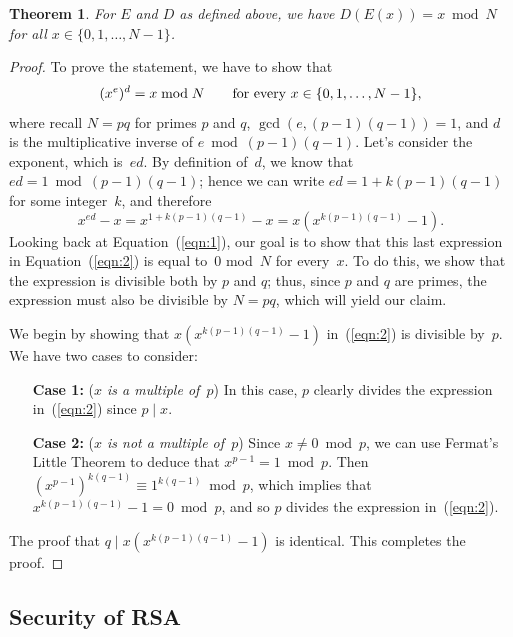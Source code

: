 \documentclass[11pt]{article}
\newcounter{thm}
\newtheorem{theorem}{Theorem}[thm]
\begin{document}
\begin{theorem}\label{thm:1}
For $E$ and $D$ as defined above, we have $D(E(x)) = x\bmod N$ for all $x\in\{0,1,\ldots,N-1\}$.
\end{theorem}
\begin{proof} To prove the statement, we have to show
that
\begin{equation}\label{eqn:1}
(x^e)^d = x\bmod N\qquad\hbox{\rm for every $x\in\{0,1,\ldots,N-1\}$},
\end{equation}
where recall $N= pq$ for primes $p$ and $q$, $\gcd(e,(p-1)(q-1))=1$, and $d$ is the multiplicative inverse of $e\bmod (p-1)(q-1)$. Let's consider the exponent, which is~$ed$.  By definition of~$d$, we know that
$ed=1\bmod (p-1)(q-1)$; hence we can write $ed = 1+k(p-1)(q-1)$ for some integer~$k$,
and therefore
\begin{equation}\label{eqn:2}
  x^{ed} - x = x^{1+k(p-1)(q-1)} - x = x(x^{k(p-1)(q-1)}-1).
\end{equation}
Looking back at Equation~(\ref{eqn:1}), our goal is to show that this last expression
in Equation~(\ref{eqn:2}) is equal to~0 mod~$N$ for every~$x$. To do this, we show that the expression is divisible both by $p$ and $q$; thus, since $p$ and $q$ are primes, the expression must also be divisible by $N=pq$, which will yield our claim.

We begin by showing that $x(x^{k(p-1)(q-1)}-1)$ in~(\ref{eqn:2}) is divisible by~$p$.  We have two cases to consider:
\begin{itemize}
\item[{\bf Case 1:}]  ({\it $x$ is a multiple of~$p$}) In this case, $p$ clearly divides the expression in~(\ref{eqn:2}) since $p\mid x$.
\item[{\bf Case 2:}] ({\it $x$ is not a multiple of~$p$}) Since $x\ne 0\bmod p$,
we can use Fermat's Little Theorem to deduce that $x^{p-1}=1\bmod p$. Then $(x^{p-1})^{k(q-1)}\equiv 1^{k(q-1)}\bmod p$, which implies that $x^{k(p-1)(q-1)}-1=0\bmod p$, and so $p$ divides the expression in~(\ref{eqn:2}).
\end{itemize}
The proof that $q\mid x(x^{k(p-1)(q-1)}-1)$ is identical. This completes the proof.
\end{proof}

\subsection{Security of RSA}\label{sscn:security}
\end{document}
